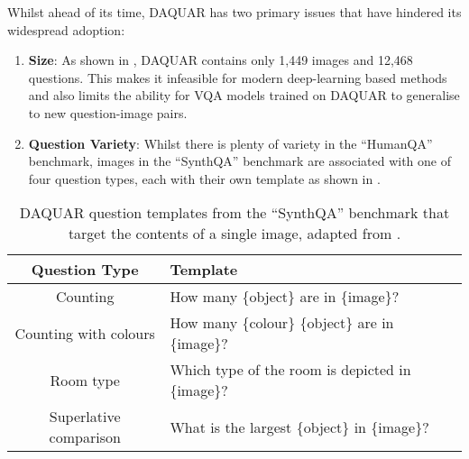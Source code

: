 Whilst ahead of its time, DAQUAR has two primary issues that have hindered its widespread adoption:
\begin{enumerate}
    \item \textbf{Size}: As shown in \tableautorefname{ \ref{tab:dataset_comparison}}, DAQUAR contains only 1,449 images and 12,468 questions. This makes it infeasible for modern deep-learning based methods and also limits the ability for VQA models trained on DAQUAR to generalise to new question-image pairs.
    \item \textbf{Question Variety}: Whilst there is plenty of variety in the ``HumanQA'' benchmark, images in the ``SynthQA'' benchmark are associated with one of four question types, each with their own template as shown in \tableautorefname{ \ref{table:daquar_templates}}.
\end{enumerate}


\begin{table}[htbp]
    \centering
    \begin{tabular}{cl}
        \toprule
        \textbf{Question Type} & \textbf{Template} \\
        \midrule
        Counting & How many \{object\} are in \{image\}?\\
        Counting with colours & How many \{colour\} \{object\} are in \{image\}?\\
        Room type & Which type of the room is depicted in \{image\}?\\
        Superlative comparison & What is the largest \{object\} in \{image\}?\\
        \bottomrule
    \end{tabular}
    \caption[DAQUAR Question templates from, adapted from \cite{malinowski2014multiworld}]{DAQUAR question templates from the ``SynthQA'' benchmark that target the contents of a single image, adapted from \cite{malinowski2014multiworld}.}
    \label{table:daquar_templates}
\end{table}




